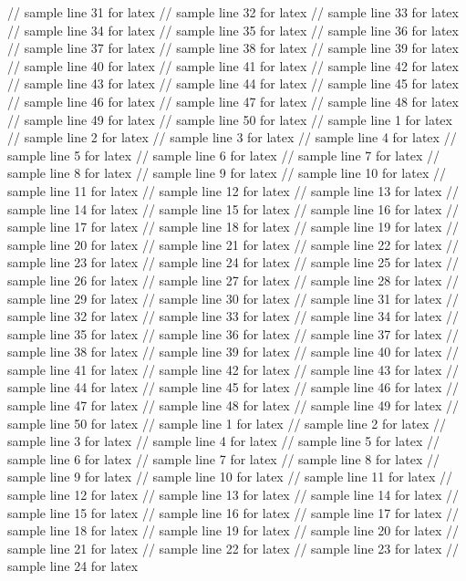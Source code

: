 // sample line 31 for latex
// sample line 32 for latex
// sample line 33 for latex
// sample line 34 for latex
// sample line 35 for latex
// sample line 36 for latex
// sample line 37 for latex
// sample line 38 for latex
// sample line 39 for latex
// sample line 40 for latex
// sample line 41 for latex
// sample line 42 for latex
// sample line 43 for latex
// sample line 44 for latex
// sample line 45 for latex
// sample line 46 for latex
// sample line 47 for latex
// sample line 48 for latex
// sample line 49 for latex
// sample line 50 for latex
// sample line 1 for latex
// sample line 2 for latex
// sample line 3 for latex
// sample line 4 for latex
// sample line 5 for latex
// sample line 6 for latex
// sample line 7 for latex
// sample line 8 for latex
// sample line 9 for latex
// sample line 10 for latex
// sample line 11 for latex
// sample line 12 for latex
// sample line 13 for latex
// sample line 14 for latex
// sample line 15 for latex
// sample line 16 for latex
// sample line 17 for latex
// sample line 18 for latex
// sample line 19 for latex
// sample line 20 for latex
// sample line 21 for latex
// sample line 22 for latex
// sample line 23 for latex
// sample line 24 for latex
// sample line 25 for latex
// sample line 26 for latex
// sample line 27 for latex
// sample line 28 for latex
// sample line 29 for latex
// sample line 30 for latex
// sample line 31 for latex
// sample line 32 for latex
// sample line 33 for latex
// sample line 34 for latex
// sample line 35 for latex
// sample line 36 for latex
// sample line 37 for latex
// sample line 38 for latex
// sample line 39 for latex
// sample line 40 for latex
// sample line 41 for latex
// sample line 42 for latex
// sample line 43 for latex
// sample line 44 for latex
// sample line 45 for latex
// sample line 46 for latex
// sample line 47 for latex
// sample line 48 for latex
// sample line 49 for latex
// sample line 50 for latex
// sample line 1 for latex
// sample line 2 for latex
// sample line 3 for latex
// sample line 4 for latex
// sample line 5 for latex
// sample line 6 for latex
// sample line 7 for latex
// sample line 8 for latex
// sample line 9 for latex
// sample line 10 for latex
// sample line 11 for latex
// sample line 12 for latex
// sample line 13 for latex
// sample line 14 for latex
// sample line 15 for latex
// sample line 16 for latex
// sample line 17 for latex
// sample line 18 for latex
// sample line 19 for latex
// sample line 20 for latex
// sample line 21 for latex
// sample line 22 for latex
// sample line 23 for latex
// sample line 24 for latex
